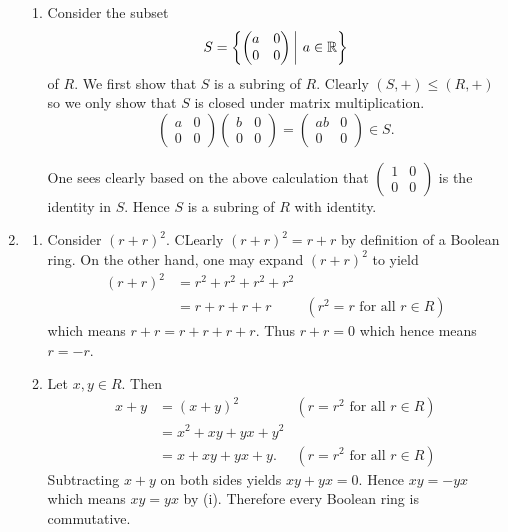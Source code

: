 \begin{enumerate}
\begin{enumerate}[label=(\roman*)]
        \item Consider the subset
        \[
            S = \left\{\begin{pmatrix}a&0\\0&0\end{pmatrix} \vert a \in \R\right\}
        \]
        of $R$. We first show that $S$ is a subring of $R$. Clearly $(S, +) \leq (R, +)$ so we only show that $S$ is closed under matrix multiplication.
        \[
            \begin{pmatrix}a&0\\0&0\end{pmatrix}\begin{pmatrix}b&0\\0&0\end{pmatrix} = \begin{pmatrix}ab&0\\0&0\end{pmatrix} \in S.
        \]

        One sees clearly based on the above calculation that $\begin{pmatrix}1&0\\0&0\end{pmatrix}$ is the identity in $S$. Hence $S$ is a subring of $R$ with identity.
    \end{enumerate}

    \item \begin{enumerate}[label=(\roman*)]
        \item Consider $(r+r)^2$. CLearly $(r+r)^2 = r+r$ by definition of a Boolean ring. On the other hand, one may expand $(r+r)^2$ to yield
        \begin{align*}
            (r+r)^2 &= r^2 + r^2 + r^2 + r^2 \\
            &= r + r + r + r & (r^2 = r \text{ for all }r \in R)
        \end{align*}
        which means $r+r = r+r+r+r$. Thus $r+r = 0$ which hence means $r=-r$.

        \item Let $x,y\in R$. Then
        \begin{align*}
            x+y &= (x+y)^2 & (r = r^2 \text{ for all }r \in R)\\
            &= x^2 + xy + yx + y^2\\
            &= x + xy + yx + y. & (r = r^2 \text{ for all }r \in R)
        \end{align*}
        Subtracting $x+y$ on both sides yields $xy +yx = 0$. Hence $xy = -yx$ which means $xy = yx$ by (i). Therefore every Boolean ring is commutative.
    \end{enumerate}


\end{enumerate}
